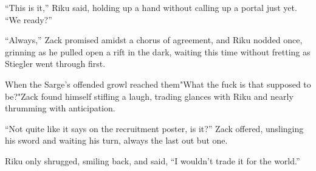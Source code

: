 ``This is it,'' Riku said, holding up a hand without calling up a portal just yet. ``We ready?''

``Always,'' Zack promised amidst a chorus of agreement, and Riku nodded once, grinning as he pulled open a rift in the dark, waiting this time without fretting as Stiegler went through first.

When the Sarge's offended growl reached them\textemdash "What the fuck is that supposed to be?"\textemdash Zack found himself stifling a laugh, trading glances with Riku and nearly thrumming with anticipation.

``Not quite like it says on the recruitment poster, is it?'' Zack offered, unslinging his sword and waiting his turn, always the last out but one.

Riku only shrugged, smiling back, and said, ``I wouldn't trade it for the world.''

\clearforchapter